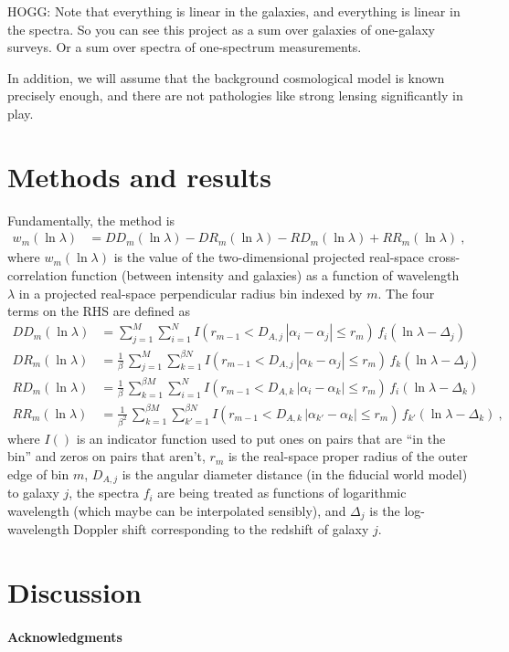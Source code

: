 \documentclass{article}
\begin{document}
HOGG: Note that everything is linear in the galaxies, and everything is linear in the spectra. So you can see this project as a sum over galaxies of one-galaxy surveys. Or a sum over spectra of one-spectrum measurements.

In addition, we will assume that the background cosmological model is known precisely enough, and there are not pathologies like strong lensing significantly in play.

\section{Methods and results}
Fundamentally, the method is
\begin{align}
    w_m(\ln\lambda) &= DD_m(\ln\lambda) - DR_m(\ln\lambda) - RD_m(\ln\lambda) + RR_m(\ln\lambda) ~,
\end{align}
where $w_m(\ln\lambda)$ is the value of the two-dimensional projected real-space cross-correlation function (between intensity and galaxies) as a function of wavelength $\lambda$ in a projected real-space perpendicular radius bin indexed by $m$.
The four terms on the RHS are defined as
\begin{align}
    DD_m(\ln\lambda) &= \sum_{j=1}^{M}\sum_{i=1}^N I(r_{m-1}<D_{A,j}\,|\alpha_i-\alpha_j|\leq r_m)\,f_i(\ln\lambda-\Delta_j) \\
    DR_m(\ln\lambda) &= \frac{1}{\beta}\,\sum_{j=1}^{M}\sum_{k=1}^{\beta N} I(r_{m-1}<D_{A,j}\,|\alpha_k-\alpha_j|\leq r_m)\,f_k(\ln\lambda-\Delta_j) \\
    RD_m(\ln\lambda) &= \frac{1}{\beta}\,\sum_{k=1}^{\beta M}\sum_{i=1}^N I(r_{m-1}<D_{A,k}\,|\alpha_i-\alpha_k|\leq r_m)\,f_i(\ln\lambda-\Delta_k) \\
    RR_m(\ln\lambda) &= \frac{1}{\beta^2}\,\sum_{k=1}^{\beta M}\sum_{k'=1}^{\beta N} I(r_{m-1}<D_{A,k}\,|\alpha_{k'}-\alpha_k|\leq r_m)\,f_{k'}(\ln\lambda-\Delta_k) ~,
\end{align}
where $I()$ is an indicator function used to put ones on pairs that are ``in the bin'' and zeros on pairs that aren't,
$r_m$ is the real-space proper radius of the outer edge of bin $m$,
$D_{A,j}$ is the angular diameter distance (in the fiducial world model) to galaxy $j$,
the spectra $f_i$ are being treated as functions of logarithmic wavelength (which maybe can be interpolated sensibly),
and $\Delta_j$ is the log-wavelength Doppler shift corresponding to the redshift of galaxy $j$.

\section{Discussion}

\paragraph{Acknowledgments}


\end{document}
